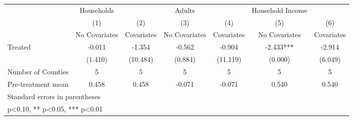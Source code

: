 {
\def\sym#1{\ifmmode^{#1}\else\(^{#1}\)\fi}
\begin{tabular}{l*{6}{c}}
\hline\hline
            &  Households   &               &      Adults   &               &Household Income   &               \\
            &\multicolumn{1}{c}{(1)}&\multicolumn{1}{c}{(2)}&\multicolumn{1}{c}{(3)}&\multicolumn{1}{c}{(4)}&\multicolumn{1}{c}{(5)}&\multicolumn{1}{c}{(6)}\\
            &\multicolumn{1}{c}{No Covariates}&\multicolumn{1}{c}{Covariates}&\multicolumn{1}{c}{No Covariates}&\multicolumn{1}{c}{Covariates}&\multicolumn{1}{c}{No Covariates}&\multicolumn{1}{c}{Covariates}\\
\hline
Treated     &      -0.011   &      -1.354   &      -0.562   &      -0.904   &      -2.433***&      -2.914   \\
            &     (1.410)   &    (10.484)   &     (0.884)   &    (11.119)   &     (0.000)   &     (6.049)   \\
\hline
Number of Counties&           5   &           5   &           5   &           5   &           5   &           5   \\
Pre-treatment mean&       0.458   &       0.458   &      -0.071   &      -0.071   &       0.540   &       0.540   \\
\hline\hline
\multicolumn{7}{l}{\footnotesize Standard errors in parentheses}\\
\multicolumn{7}{l}{\footnotesize * p<0.10, ** p<0.05, *** p<0.01}\\
\end{tabular}
}
